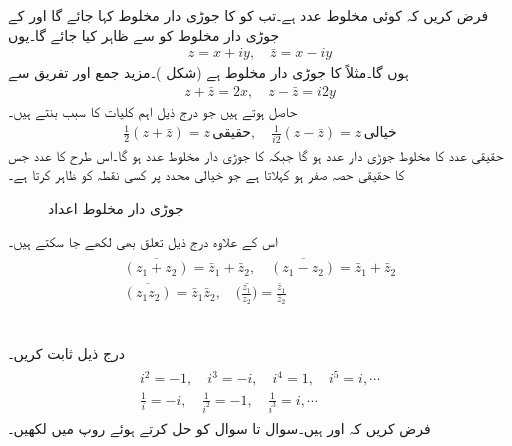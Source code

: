 فرض کریں کہ  کوئی مخلوط عدد ہے۔تب  کو  کا جوڑی دار مخلوط کہا جائے گا اور  کے جوڑی دار مخلوط کو  سے ظاہر کیا جائے گا۔یوں
\begin{align*}
z=x+iy,\quad \bar{z}=x-iy
\end{align*}
ہوں گا۔مثلاً  کا جوڑی دار مخلوط  ہے (شکل )۔مزید جمع اور تفریق سے
\begin{align*}
z+\bar{z}=2x,\quad z-\bar{z}=i2y
\end{align*}
حاصل ہوتے ہیں جو درج ذیل اہم کلیات کا سبب بنتے ہیں۔
\begin{align}
\frac{1}{2}(z+\bar{z})=z\,\text{حقیقی}, \quad \frac{1}{i2}(z-\bar{z})=z\,\text{خیالی}
\end{align}
حقیقی عدد  کا مخلوط جوڑی دار عدد  ہو گا جبکہ  کا جوڑی دار مخلوط عدد  ہو گا۔اس طرح کا عدد جس کا حقیقی حصہ صفر ہو  کہلاتا ہے جو خیالی محدد پر کسی نقطہ کو ظاہر کرتا ہے۔
%
\begin{figure}
\centering
{}
\caption{جوڑی دار مخلوط اعداد}
\label{شکل_مخلوط_جوڑی_دار}
\end{figure}

اس کے علاوہ درج ذیل تعلق بھی لکھے جا سکتے ہیں۔
\begin{gather}
\begin{aligned}\label{مساوات_مخلوط_تعلقات}
\overline{(z_1+z_2)}=\bar{z}_1+\bar{z}_2,\quad \overline{(z_1-z_2)}=\bar{z}_1+\bar{z}_2\\
\overline{(z_1z_2)}=\bar{z}_1\bar{z}_2,\quad \overline{\big(\frac{z_1}{z_2}\big)}=\frac{\bar{z}_1}{\bar{z}_2}
\end{aligned}
\end{gather}


\quad {}\\
درج ذیل ثابت کریں۔
\begin{gather}
 \begin{aligned}
i^2=-1,\quad i^3=-i,\quad i^4=1, \quad i^5=i,\cdots\\
\frac{1}{i}=-i, \quad \frac{1}{i^2}=-1,\quad \frac{1}{i^3}=i,\cdots
\end{aligned}
\end{gather}
فرض کریں کہ  اور  ہیں۔سوال  تا سوال  کو حل کرتے ہوئے  روپ میں لکھیں۔

